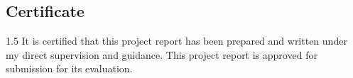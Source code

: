 \begin{center}
  \section*{Certificate}
\end{center}


\begin{spacing}{1.5}
It is certified that this project report has been prepared and written under my direct supervision and guidance. This project report is approved for submission for its evaluation.
\end{spacing}

\begin{flushright}
  {\supervisorname}
\end{flushright}

\clearpage
\vspace*{2cm}
